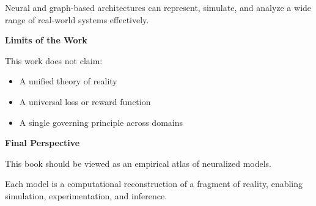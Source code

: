 Neural and graph-based architectures can represent, simulate, and analyze a wide range of real-world systems effectively.

\textbf{Limits of the Work}

This work does not claim:
\begin{itemize}
\item A unified theory of reality
\item A universal loss or reward function
\item A single governing principle across domains
\end{itemize}

\textbf{Final Perspective}

This book should be viewed as an empirical atlas of neuralized models.

Each model is a computational reconstruction of a fragment of reality, enabling simulation, experimentation, and inference.

